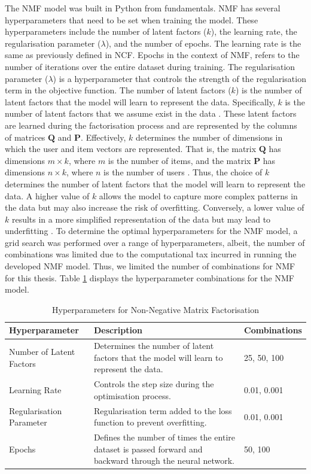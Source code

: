 The NMF model was built in Python from fundamentals. NMF has several hyperparameters that need to be set when training the model. These hyperparameters include the number of latent factors ($k$), the learning rate, the regularisation parameter ($\lambda$), and the number of epochs. The learning rate is the same as previously defined in NCF. Epochs in the context of NMF, refers to the number of iterations over the entire dataset during training. The regularisation parameter ($\lambda$) is a hyperparameter that controls the strength of the regularisation term in the objective function. The number of latent factors ($k$) is the number of latent factors that the model will learn to represent the data. Specifically, $k$ is the number of latent factors that we assume exist in the data \cite{}. These latent factors are learned during the factorisation process and are represented by the columns of matrices $\mathbf{Q}$ and $\mathbf{P}$. Effectively, $k$ determines the number of dimensions in which the user and item vectors are represented. That is, the matrix $\mathbf{Q}$ has dimensions $m \times k$, where $m$ is the number of items, and the matrix $\mathbf{P}$ has dimensions $n \times k$, where $n$ is the number of users \cite{}. Thus, the choice of $k$ determines the number of latent factors that the model will learn to represent the data. A higher value of $k$ allows the model to capture more complex patterns in the data but may also increase the risk of overfitting. Conversely, a lower value of $k$ results in a more simplified representation of the data but may lead to underfitting \cite{}. To determine the optimal hyperparameters for the NMF model, a grid search was performed over a range of hyperparameters, albeit, the number of combinations was limited due to the computational tax incurred in running the developed NMF model. Thus, we limited the number of combinations for NMF for this thesis. Table \ref{hyper_params_mf} displays the hyperparameter combinations for the NMF model.



\begin{table}[h]
    \centering
    \begin{tabular}{|p{5cm}|p{7cm}|p{3.5cm}|}
    \hline
    \textbf{Hyperparameter} & \textbf{Description}  & \textbf{Combinations} \\
    \hline
    Number of Latent Factors & Determines the number of latent factors that the model will learn to represent the data. & 25, 50, 100 \\
    Learning Rate & Controls the step size during the optimisation process. & 0.01, 0.001 \\
    Regularisation Parameter & Regularisation term added to the loss function to prevent overfitting. & 0.01, 0.001 \\
    Epochs & Defines the number of times the entire dataset is passed forward and backward through the neural network. & 50, 100 \\
    \hline
    \end{tabular}
    \caption{Hyperparameters for Non-Negative Matrix Factorisation}
    \label{hyper_params_mf}
    \end{table}


